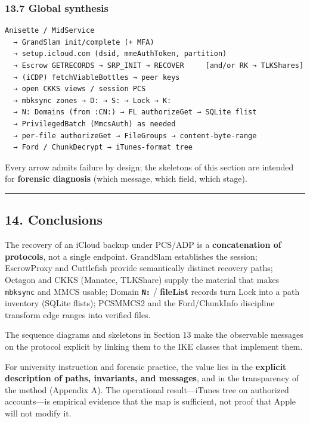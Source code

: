 \documentclass[
  english,
  10pt]{article}
\begin{document}
\subsubsection{13.7 Global synthesis}\label{global-synthesis}

\begin{verbatim}
Anisette / MidService
  → GrandSlam init/complete (+ MFA)
  → setup.icloud.com (dsid, mmeAuthToken, partition)
  → Escrow GETRECORDS → SRP_INIT → RECOVER     [and/or RK → TLKShares]
  → (iCDP) fetchViableBottles → peer keys
  → open CKKS views / session PCS
  → mbksync zones → D: → S: → Lock → K:
  → N: Domains (from :CN:) → FL authorizeGet → SQLite flist
  → PrivilegedBatch (MmcsAuth) as needed
  → per-file authorizeGet → FileGroups → content-byte-range
  → Ford / ChunkDecrypt → iTunes-format tree
\end{verbatim}

Every arrow admits failure by design; the skeletons of this section are
intended for \textbf{forensic diagnosis} (which message, which field,
which stage).

\begin{center}\rule{0.5\linewidth}{0.5pt}\end{center}

\subsection{14. Conclusions}\label{conclusions}

The recovery of an iCloud backup under PCS/ADP is a
\textbf{concatenation of protocols}, not a single endpoint. GrandSlam
establishes the session; EscrowProxy and Cuttlefish provide semantically
distinct recovery paths; Octagon and CKKS (Manatee, TLKShare) supply the
material that makes \texttt{mbksync} and MMCS usable; Domain
\textbf{\texttt{N:}} / \textbf{fileList} records turn Lock into a path
inventory (SQLite flists); PCSMMCS2 and the Ford/ChunkInfo discipline
transform edge ranges into verified files.

The sequence diagrams and skeletons in Section 13 make the observable
messages on the protocol explicit by linking them to the IKE classes
that implement them.

For university instruction and forensic practice, the value lies in the
\textbf{explicit description of paths, invariants, and messages}, and in
the transparency of the method (Appendix A). The operational
result---iTunes tree on authorized accounts---is empirical evidence that
the map is sufficient, not proof that Apple will not modify it.
\end{document}
